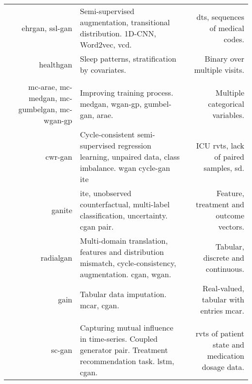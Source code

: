 \begin{center}
\begin{longtable}[l]{@{}p{}NMR@{}}
        \citeauthor{Che_2017} & \gls{ehrgan}, \gls{ssl-gan} 
        & Semi-supervised augmentation, transitional distribution. 1D-CNN, Word2vec, \gls{vcd}.
        & \Gls{dts}, sequences of medical codes. \\
        
        \citeauthor{Dash} & \gls{healthgan} & Sleep patterns, stratification by covariates. & Binary over multiple visits.\\
        
        \hline
         & & & \\
        \hline
        
        \citeauthor{Camino2018-re} & \raggedright \gls{mc-arae}, \gls{mc-medgan}, \gls{mc-gumbelgan}, \gls{mc-wgan-gp}
        & Improving training process. \gls{medgan}, \gls{wgan-gp}, \gls{gumbel-gan}, \gls{arae}.
        & Multiple categorical variables. \\
        
        \citeauthor{mcdermott2018semi} & \gls{cwr-gan}
        & Cycle-consistent semi-supervised regression learning, unpaired data, class imbalance. \gls{wgan} \gls{cycle-gan} \gls{ite}
        & ICU \gls{rvts}, lack of paired samples, \gls{sd}. \\
        
        \citeauthor{Yoon2018-ite} & \gls{ganite} 
        & \gls{ite}, unobserved counterfactual, multi-label classification, uncertainty. \gls{cgan} pair.
        & Feature, treatment and outcome vectors.\\
        
        \citeauthor{Yoon2018-radial} & \gls{radialgan} 
        & Multi-domain translation, features and distribution mismatch, cycle-consistency, augmentation. \gls{cgan}, \gls{wgan}.
        & Tabular, discrete and continuous.\\
        
        \citeauthor{yoon2018imputation} & \gls{gain}
        & Tabular data imputation. \gls{mcar}, \gls{cgan}.
        & Real-valued, tabular with entries \gls{mcar}.\\
        
        \hline
         & & & \\
        \hline
        
        \citeauthor{Wang_2019} & \gls{sc-gan}
        & Capturing mutual influence in time-series. Coupled generator pair. Treatment recommendation task. \gls{lstm}, \gls{cgan}.
        & \Gls{rvts} of patient state and medication dosage data.\\
        

\end{longtable}
\end{center}
